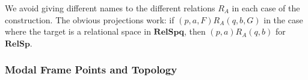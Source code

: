 \documentclass{article}[a4paper]
\theoremstyle{definition}
\newcommand{\topcat}{\mathbf{Top}}
\newcommand{\rels}{\mathbf{RelS}}
\newcommand{\relsp}{\mathbf{RelSp}}
\newcommand{\relspl}{\mathbf{RelSp^l}}
\newcommand{\relspq}{\mathbf{RelSpq}}
\newcommand{\relspqu}{\mathbf{RelSpq^u}}
\newcommand{\relspql}{\mathbf{RelSpq^l}}
\newcommand{\relspqc}{\mathbf{RelSpq^c}}
\newcommand{\eqspq}{\mathbf{EqSpq}}
\newcommand{\frm}{\mathbf{Frm}}
\newcommand{\mfrm}{\mathbf{MFrm}}
\newcommand{\mfrms}{\mathbf{MFrm}^{\scalebox{.5}{\algbox\!\!\!\algdiamond}}}
\newcommand{\mfrmbs}{\mathbf{MFrm}^{\scalebox{.5}{\algbox}}}
\newcommand{\mfrmds}{\mathbf{MFrm}^{\scalebox{.5}{\algdiamond}}}
\newcommand{\eqfrm}{\mathbf{EqFrm}}
\DeclareMathOperator{\pt}{\mathrm{pt}}
\begin{document}
%

We avoid giving different names to the different relations $R_A$ in each case of the construction. The obvious projections work: if $(p,a,F) R_A (q,b,G)$ in the case where the target is a relational space in $\relspq$, then $(p,a) R_A (q,b)$ for $\relsp$.

\subsubsection{Modal Frame Points and Topology}
\end{document}
